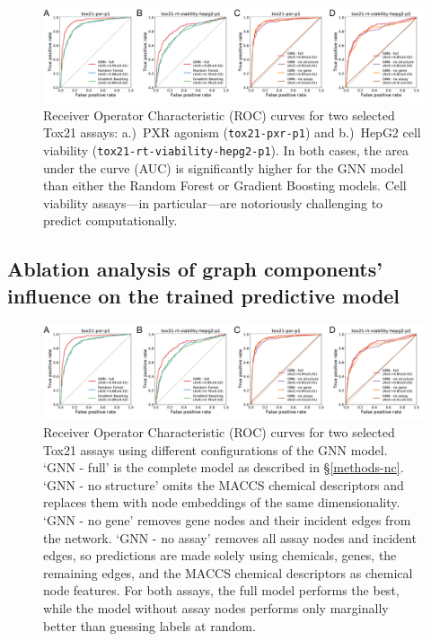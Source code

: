 \documentclass{ws-procs11x85}
\begin{document}
\begin{figure}
   \centering
   \includegraphics[width=\textwidth]{figures/figure3.pdf}
   \caption{Receiver Operator Characteristic (ROC) curves for two selected Tox21 assays: a.)~PXR agonism (\texttt{tox21-pxr-p1}) and b.)~HepG2 cell viability (\texttt{tox21-rt-viability-hepg2-p1}). In both cases, the area under the curve (AUC) is significantly higher for the GNN model than either the Random Forest or Gradient Boosting models. Cell viability assays---in particular---are notoriously challenging to predict computationally.}
\end{figure}

\subsection{Ablation analysis of graph components' influence on the trained predictive model}

\begin{figure}
   \centering
   \includegraphics[width=\textwidth]{figures/figure3.pdf}
   \caption{Receiver Operator Characteristic (ROC) curves for two selected Tox21 assays using different configurations of the GNN model. `GNN - full' is the complete model as described in \S\ref{methods-nc}. `GNN - no structure' omits the MACCS chemical descriptors and replaces them with node embeddings of the same dimensionality. `GNN - no gene' removes gene nodes and their incident edges from the network. `GNN - no assay' removes all assay nodes and incident edges, so predictions are made solely using chemicals, genes, the remaining edges, and the MACCS chemical descriptors as chemical node features. For both assays, the full model performs the best, while the model without assay nodes performs only marginally better than guessing labels at random.}
\end{figure}
\end{document}
